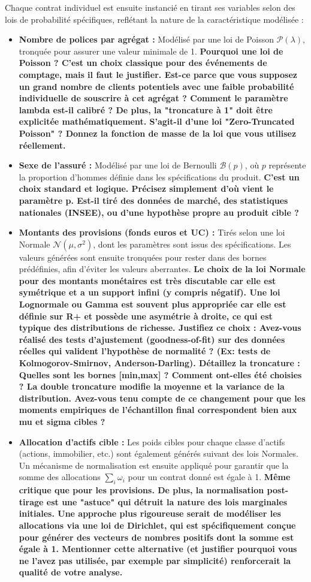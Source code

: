Chaque contrat individuel est ensuite instancié en tirant ses variables selon des lois de probabilité spécifiques, reflétant la nature de la caractéristique modélisée :
\begin{itemize}
    \item \textbf{Nombre de polices par agrégat :} Modélisé par une loi de Poisson $\mathcal{P}(\lambda)$, tronquée pour assurer une valeur minimale de 1. \textbf{ Pourquoi une loi de Poisson ? C'est un choix classique pour des événements de comptage, mais il faut le justifier. Est-ce parce que vous supposez un grand nombre de clients potentiels avec une faible probabilité individuelle de souscrire à cet agrégat ? Comment le paramètre lambda est-il calibré ? De plus, la "troncature à 1" doit être explicitée mathématiquement. S'agit-il d'une loi "Zero-Truncated Poisson" ? Donnez la fonction de masse de la loi que vous utilisez réellement.}
    \item \textbf{Sexe de l'assuré :} Modélisé par une loi de Bernoulli $\mathcal{B}(p)$, où $p$ représente la proportion d'hommes définie dans les spécifications du produit. \textbf{C'est un choix standard et logique. Précisez simplement d'où vient le paramètre p. Est-il tiré des données de marché, des statistiques nationales (INSEE), ou d'une hypothèse propre au produit cible ?}
    \item \textbf{Montants des provisions (fonds euros et UC) :} Tirés selon une loi Normale $\mathcal{N}(\mu, \sigma^2)$, dont les paramètres sont issus des spécifications. Les valeurs générées sont ensuite tronquées pour rester dans des bornes prédéfinies, afin d'éviter les valeurs aberrantes. \textbf{Le choix de la loi Normale pour des montants monétaires est très discutable car elle est symétrique et a un support infini (y compris négatif). Une loi Lognormale ou Gamma est souvent plus appropriée car elle est définie sur R+ et possède une asymétrie à droite, ce qui est typique des distributions de richesse.
    Justifiez ce choix : Avez-vous réalisé des tests d'ajustement (goodness-of-fit) sur des données réelles qui valident l'hypothèse de normalité ? (Ex: tests de Kolmogorov-Smirnov, Anderson-Darling).
    Détaillez la troncature : Quelles sont les bornes [min,max] ? Comment ont-elles été choisies ? La double troncature modifie la moyenne et la variance de la distribution. Avez-vous tenu compte de ce changement pour que les moments empiriques de l'échantillon final correspondent bien aux mu et sigma cibles ?}
    \item \textbf{Allocation d'actifs cible :} Les poids cibles pour chaque classe d'actifs (actions, immobilier, etc.) sont également générés suivant des lois Normales. Un mécanisme de normalisation est ensuite appliqué pour garantir que la somme des allocations $\sum_{i} \omega_i$ pour un contrat donné est égale à 1. \textbf{Même critique que pour les provisions. De plus, la normalisation post-tirage est une "astuce" qui détruit la nature des lois marginales initiales. Une approche plus rigoureuse serait de modéliser les allocations via une loi de Dirichlet, qui est spécifiquement conçue pour générer des vecteurs de nombres positifs dont la somme est égale à 1. Mentionner cette alternative (et justifier pourquoi vous ne l'avez pas utilisée, par exemple par simplicité) renforcerait la qualité de votre analyse.}

\end{itemize}
